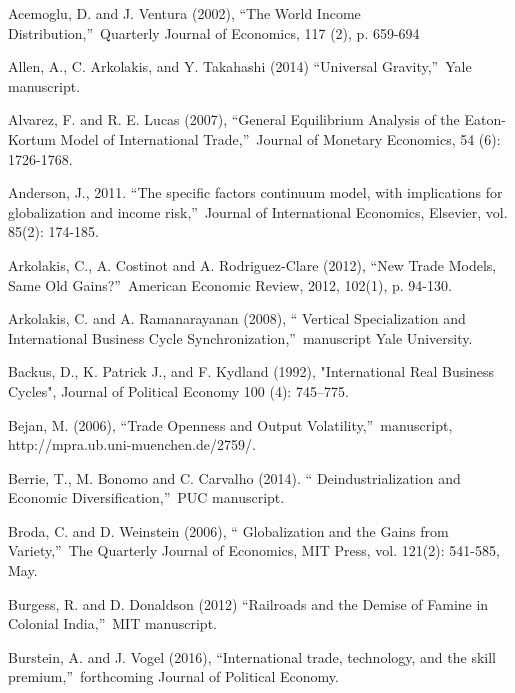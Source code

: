 \documentclass[12pt]{article}
\begin{document}
\begin{thebibliography}{99}
\bibitem{} Acemoglu, D. and J. Ventura (2002), \textquotedblleft The World
Income Distribution,\textquotedblright\ Quarterly Journal of Economics, 117
(2), p. 659-694

\bibitem{} Allen, A., C. Arkolakis, and Y. Takahashi (2014)
\textquotedblleft Universal Gravity,\textquotedblright\ Yale manuscript.

\bibitem{} Alvarez, F. and R. E. Lucas (2007), \textquotedblleft General
Equilibrium Analysis of the Eaton-Kortum Model of International
Trade,\textquotedblright\ Journal of Monetary Economics, 54 (6): 1726-1768.

\bibitem{} Anderson, J., 2011. \textquotedblleft The specific factors
continuum model, with implications for globalization and income
risk,\textquotedblright\ Journal of International Economics, Elsevier, vol.
85(2): 174-185.

\bibitem{} Arkolakis, C., A. Costinot and A. Rodriguez-Clare (2012),
\textquotedblleft New Trade Models, Same Old Gains?\textquotedblright\
American Economic Review, 2012, 102(1), p. 94-130.

\bibitem{} Arkolakis, C. and A. Ramanarayanan (2008), \textquotedblleft
Vertical Specialization and International Business Cycle
Synchronization,\textquotedblright\ manuscript Yale University.

\bibitem{} Backus, D., K. Patrick J., and F. Kydland (1992), "International
Real Business Cycles", Journal of Political Economy 100 (4): 745--775.

\bibitem{} Bejan, M. (2006), \textquotedblleft Trade Openness and Output
Volatility,\textquotedblright\ manuscript,
http://mpra.ub.uni-muenchen.de/2759/.

\bibitem{} Berrie, T., M. Bonomo and C. Carvalho (2014). \textquotedblleft
Deindustrialization and Economic Diversification,\textquotedblright\ PUC
manuscript.

\bibitem{} Broda, C. and D. Weinstein (2006), \textquotedblleft
Globalization and the Gains from Variety,\textquotedblright\ The Quarterly
Journal of Economics, MIT Press, vol. 121(2): 541-585, May.

\bibitem{} Burgess, R. and D. Donaldson (2012) \textquotedblleft Railroads
and the Demise of Famine in Colonial India,\textquotedblright\ MIT
manuscript.

\bibitem{} Burstein, A. and J. Vogel (2016), \textquotedblleft International
trade, technology, and the skill premium,\textquotedblright\ forthcoming
Journal of Political Economy.


\end{thebibliography}
\end{document}
